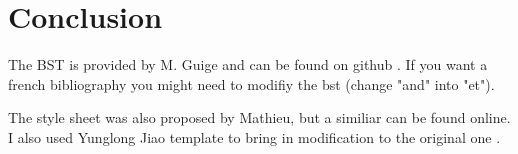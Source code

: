 \chapter{Conclusion}
\label{conclusion}


The BST is provided by M. Guige and can be found on github \cite{mieuxdumonde}.
If you want a french bibliography you might need to modifiy the bst (change "and" into "et").

The style sheet was also proposed by Mathieu, but a similiar can be found online.
I also used Yunglong Jiao template to bring in modification to the original one \cite{yunglong_thesis}.